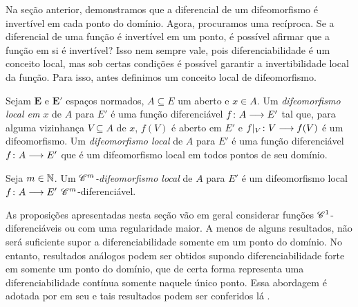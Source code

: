 Na seção anterior, demonstramos que a diferencial de um difeomorfismo é invertível em cada ponto do domínio. Agora, procuramos uma recíproca. Se a diferencial de uma função é invertível em um ponto, é possível afirmar que a função em si é invertível? Isso nem sempre vale, pois diferenciabilidade é um conceito local, mas sob certas condições é possível garantir a invertibilidade local da função. Para isso, antes definimos um conceito local de difeomorfismo.

\begin{definition}
Sejam $\bm E$ e $\bm E'$ espaços normados, $A \subseteq E$ um aberto e $x \in A$. Um \emph{difeomorfismo local em $x$} de $A$ para $E'$ é uma função diferenciável $f\colon \allowbreak A \longrightarrow E'$ tal que, para alguma vizinhança $V \subseteq A$ de $x$, $f(V)$ é aberto em $E'$ e $f|_V\colon \allowbreak V \longrightarrow f(V)$ é um difeomorfismo.
Um \emph{difeomorfismo local} de $A$ para $E'$ é uma função diferenciável $f\colon \allowbreak A \longrightarrow E'$ que é um difeomorfismo local em todos pontos de seu domínio.

Seja $m \in \mathbb{N}$. Um \emph{$\mathscr{C}^m$-difeomorfismo local} de $A$ para $E'$ é um difeomorfismo local $f\colon \allowbreak A \longrightarrow E'$ $\mathscr{C}^m$-diferenciável.
\end{definition}

As proposições apresentadas nesta seção vão em geral considerar funções $\mathscr{C}^1$-diferenciáveis ou com uma regularidade maior. A menos de alguns resultados, não será suficiente supor a diferenciabilidade somente em um ponto do domínio. No entanto, resultados análogos podem ser obtidos supondo diferenciabilidade forte em somente um ponto do domínio, que de certa forma representa uma diferenciabilidade contínua somente naquele único ponto. Essa abordagem é adotada por \citeauthor{liv:Lima-CursoAnalise2} em seu  e tais resultados podem ser conferidos lá \cite[pp. 286, 287]{liv:Lima-CursoAnalise2}.




